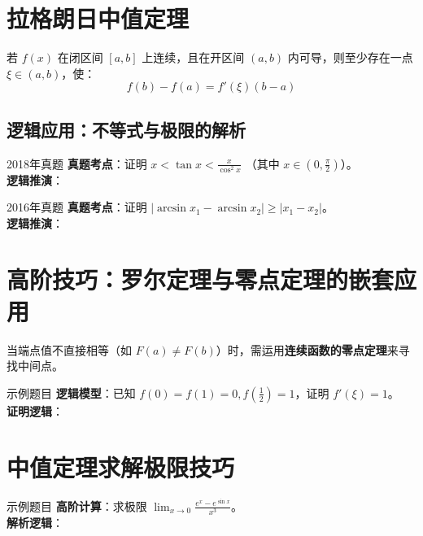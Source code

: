 \documentclass[UTF8]{ctexart}
\begin{document}
\section{拉格朗日中值定理}

\begin{conceptbox}[定理 2：拉格朗日中值定理]
若 $f(x)$ 在闭区间 $[a, b]$ 上连续，且在开区间 $(a, b)$ 内可导，则至少存在一点 $\xi \in (a, b)$，使：
$$f(b) - f(a) = f'(\xi)(b - a)$$
\end{conceptbox}

\subsection{逻辑应用：不等式与极限的解析}

\begin{examnote}{2018年真题}
\textbf{真题考点}：证明 $x < \tan x < \frac{x}{\cos^2 x}$ （其中 $x \in (0, \frac{\pi}{2})$）。\\
\textbf{逻辑推演}：\vspace{2cm} %
\end{examnote}

\begin{examnote}{2016年真题}
\textbf{真题考点}：证明 $|\arcsin x_1 - \arcsin x_2| \ge |x_1 - x_2|$。\\
\textbf{逻辑推演}：\vspace{2cm} %
\end{examnote}

\section{高阶技巧：罗尔定理与零点定理的嵌套应用}
当端点值不直接相等（如 $F(a) \neq F(b)$）时，需运用\textbf{连续函数的零点定理}来寻找中间点。

\begin{examnote}{示例题目}
\textbf{逻辑模型}：已知 $f(0)=f(1)=0, f(\frac{1}{2})=1$，证明 $f'(\xi)=1$。\\
\textbf{证明逻辑}：\vspace{3cm} %
\end{examnote}

\section{中值定理求解极限技巧}
\begin{examnote}{示例题目}
\textbf{高阶计算}：求极限 $\lim_{x \to 0} \frac{e^x - e^{\sin x}}{x^3}$。\\
\textbf{解析逻辑}：\vspace{3cm} %
\end{examnote}
\end{document}
